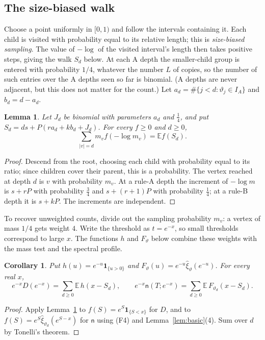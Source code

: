 \documentclass[11pt]{article}
\newtheorem{lemma}[theorem]{Lemma}
\newtheorem{corollary}[theorem]{Corollary}
\theoremstyle{definition}
\theoremstyle{remark}
\newcommand{\one}{\mathbf 1}
\newcommand{\ncount}{\mathsf n}
\newcommand{\E}{\mathbb E}
\begin{document}
\subsection{The size-biased walk}
Choose a point uniformly in $[0,1)$ and follow the intervals containing
it. Each child is visited with probability equal to its relative length;
this is \emph{size-biased sampling}. The value of $-\log$ of the visited
interval's length then takes positive steps, giving the walk $S_d$
below. At each A depth the smaller-child group is entered with
probability $1/4$, whatever the number $L$ of copies, so the number of
such entries over the A depths seen so far is binomial. (A depths are
never adjacent, but this does not matter for the count.)
Let $a_d=\#\{j<d:\vartheta_j\in I_A\}$ and $b_d=d-a_d$.

\begin{lemma}\label{lem:walk}
Let $J_d$ be binomial with parameters $a_d$ and $\frac14$, and put
$S_d=ds+P(ra_d+kb_d+J_d)$. For every $f\ge0$ and $d\ge0$,
\[
 \sum_{|v|=d}m_vf(-\log m_v)=\E f(S_d).
\]
\end{lemma}
\begin{proof}
Descend from the root, choosing each child with probability equal to its
ratio; since children cover their parent, this is a probability. The
vertex reached at depth $d$ is $v$ with probability $m_v$. At a rule-A
depth the increment of $-\log m$ is $s+rP$ with probability $\frac34$ and $s+(r+1)P$
with probability $\frac14$; at a rule-B depth it is $s+kP$. The increments
are independent.
\end{proof}

To recover unweighted counts, divide out the sampling probability $m_v$:
a vertex of mass $1/4$ gets weight $4$. Write the threshold as
$t=e^{-x}$, so small thresholds correspond to large $x$. The functions
$h$ and $F_\vartheta$ below combine these weights with the mass test and
the spectral profile.
\begin{corollary}\label{cor:repr}
Put $h(u)=e^{-u}\one_{\{u>0\}}$ and
$F_\vartheta(u)=e^{-u}\widehat\xi_\vartheta(e^{-u})$. For every real $x$,
\[
 e^{-x}D(e^{-x})=\sum_{d\ge0}\E\,h(x-S_d),\qquad
 e^{-x}\ncount(T;e^{-x})=\sum_{d\ge0}\E\,F_{\vartheta_d}(x-S_d).
\]
\end{corollary}
\begin{proof}
Apply Lemma~\ref{lem:walk} to $f(S)=e^{S}\one_{\{S<x\}}$ for $D$, and to
$f(S)=e^{S}\widehat\xi_{\vartheta_d}(e^{S-x})$ for $\ncount$ using (F4) and
Lemma~\ref{lem:basic}(4). Sum over $d$ by Tonelli's theorem.
\end{proof}
\end{document}
